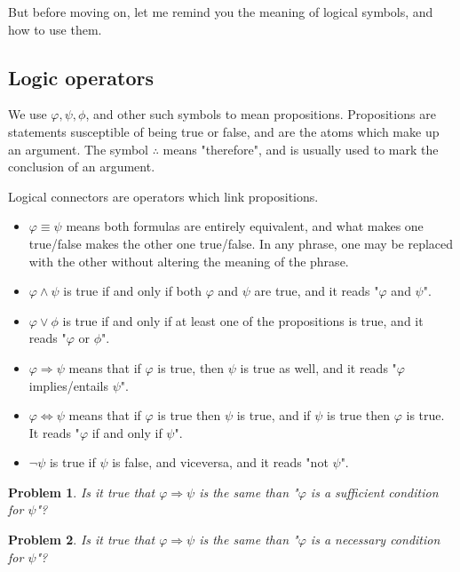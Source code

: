 \documentclass[a4paper, 12pt]{article}
\newtheorem{problem}{Problem}
\newtheorem{problem}{Problem}
\begin{document}
But before moving on, let me remind you the meaning of logical symbols, and how to use them.

\subsection{Logic operators}

We use $\varphi, \psi, \phi$, and other such symbols to mean propositions. Propositions are 
statements susceptible of being true or false, and are the atoms which make up 
an argument. The symbol $\therefore $ means "therefore", and is usually used to 
mark the conclusion of an argument. 


Logical connectors are operators which link propositions.

\begin{itemize}
    \item $\varphi \equiv \psi$ means both formulas are entirely equivalent,
        and what makes one true/false makes the other one true/false. In any
        phrase, one may be replaced with the other without altering the meaning
        of the phrase.
    \item $\varphi \land  \psi$ is true if and only if both $\varphi$ and
        $\psi$ are true, and it reads "$\varphi$ and $\psi$".
    \item $\varphi \lor  \phi$ is true if and only if at least one of the propositions is true, 
        and it reads "$\varphi$ or $\phi$".
    \item $\varphi \Rightarrow \psi$ means that if $\varphi$ is true, then 
        $\psi$ is true as well, and it reads "$\varphi$ implies/entails $\psi$".
     
    \item $\varphi \iff \psi$ means that if $\varphi$ is true then $\psi$ is true, 
    and if $\psi$ is true then $\varphi$ is true. It reads "$\varphi$ if and only if $\psi$".
    \item $\neg \psi$ is true if $\psi$ is false, and viceversa, and it reads "not $\psi$".
\end{itemize}

\begin{problem}
    Is it true that $\varphi \Rightarrow \psi$ is the same than "$\varphi$ is a sufficient condition for $\psi$"?
\end{problem}

\begin{problem}
    Is it true that $\varphi \Rightarrow \psi$ is the same than "$\varphi$ is a necessary 
    condition for $\psi$"?
\end{problem}
\end{document}
